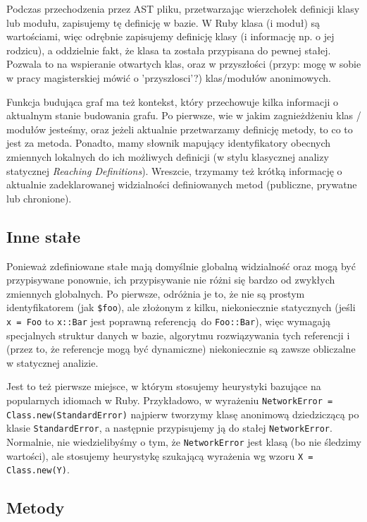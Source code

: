 \documentclass[declaration,shortabstract]{iithesis}
\begin{document}
Podczas przechodzenia przez AST pliku, przetwarzając wierzchołek definicji klasy lub modułu, zapisujemy tę definicję w bazie. W Ruby klasa (i moduł) są wartościami, więc odrębnie zapisujemy definicję klasy (i informację np. o jej rodzicu), a oddzielnie fakt, że klasa ta została przypisana do pewnej stałej. Pozwala to na wspieranie otwartych klas, oraz w przyszłości (przyp: mogę w sobie w pracy magisterskiej mówić o 'przyszlosci'?) klas/modułów anonimowych.

Funkcja budująca graf ma też kontekst, który przechowuje kilka informacji o aktualnym stanie budowania grafu. Po pierwsze, wie w jakim zagnieżdżeniu klas / modułów jesteśmy, oraz jeżeli aktualnie przetwarzamy definicję metody, to co to jest za metoda. Ponadto, mamy słownik mapujący identyfikatory obecnych zmiennych lokalnych do ich możliwych definicji (w stylu klasycznej analizy statycznej \textit{Reaching Definitions}). Wreszcie, trzymamy też krótką informację o aktualnie zadeklarowanej widzialności definiowanych metod (publiczne, prywatne lub chronione).

\subsection{Inne stałe}

Ponieważ zdefiniowane stałe mają domyślnie globalną widzialność oraz mogą być przypisywane ponownie, ich przypisywanie nie różni się bardzo od zwykłych zmiennych globalnych. Po pierwsze, odróżnia je to, że nie są prostym identyfikatorem (jak \texttt{\$foo}), ale złożonym z kilku, niekoniecznie statycznych (jeśli \texttt{x = Foo} to \texttt{x::Bar} jest poprawną referencją do \texttt{Foo::Bar}), więc wymagają specjalnych struktur danych w bazie, algorytmu rozwiązywania tych referencji i (przez to, że referencje mogą być dynamiczne) niekoniecznie są zawsze obliczalne w statycznej analizie.

Jest to też pierwsze miejsce, w którym stosujemy heurystyki bazujące na popularnych idiomach w Ruby. Przykładowo, w wyrażeniu \texttt{NetworkError = Class.new(StandardError)} najpierw tworzymy klasę anonimową dziedziczącą po klasie \texttt{StandardError}, a następnie przypisujemy ją do stałej \texttt{NetworkError}. Normalnie, nie wiedzielibyśmy o tym, że \texttt{NetworkError} jest klasą (bo nie śledzimy wartości), ale stosujemy heurystykę szukającą wyrażenia wg wzoru \texttt{X = Class.new(Y)}.

\subsection{Metody}
\end{document}
